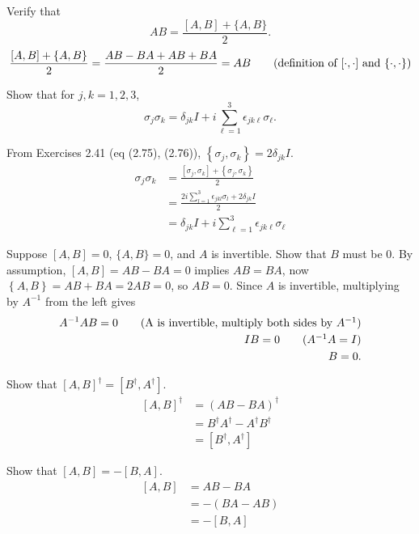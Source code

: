  Verify that $$AB = \frac{[A,B]+\{A,B\}}{2}.$$
\Soln
\begin{align*}
	\frac{\left[A, B \right] + \left\{A, B\right\}}{2} = \frac{AB - BA + AB + BA}{2} = AB \tag{definition of $[\cdot,\cdot]$ and $\{\cdot,\cdot\}$}
\end{align*}

 Show that for $j,k=1,2,3$, $$\sigma_j\sigma_k = \delta_{jk}I+i\sum_{\ell=1}^3\epsilon_{jk\ell}\sigma_\ell.$$

From Exercises 2.41 (eq (2.75), (2.76)), $\left\{\sigma_j,  \sigma_k \right\} = 2 \delta_{jk} I$.
\begin{align*}
	\sigma_j \sigma_k &= \frac{\left[\sigma_j, \sigma_k  \right] + \left\{\sigma_j, \sigma_k \right\}}{2}\tag{Exercise 2.42 (eq 2.77)}\\
		&= \frac{2i \sum_{l=1}^{3} \epsilon_{jkl}\sigma_l +  2 \delta_{jk} I}{2} \tag{Exercise 2.40 (eq 2.74) and above}\\
		&= \delta_{jk} I + i \sum_{\ell=1}^{3} \epsilon_{jk\ell}\sigma_\ell\tag{cancel 2s}
\end{align*}


 Suppose $[A, B] = 0$, $\{A, B\} = 0$, and $A$ is invertible.  Show that $B$ must be 0.
\Soln
By assumption, $\left[A, B\right] = AB-BA=0$ implies $AB=BA$, now $\left\{A, B\right\} = AB+BA=2AB=0$, so $AB = 0$.
Since $A$ is invertible, multiplying by $A^{-1}$ from the left gives
\begin{align*}
	A^{-1} AB = 0 \tag{A is invertible, multiply both sides by $A^{-1}$}\\
	IB = 0 \tag{$A^{-1}A=I$}\\
	B=0.
\end{align*}


 Show that $[A, B]^\dagger = [B^\dagger, A^\dagger]$.
\Soln
\begin{align*}
	\left[A, B\right]^\dagger &= (AB -BA)^\dagger \tag{definition of $[\cdot,\cdot]$}\\
		&= B^\dagger A^\dagger - A^\dagger B^\dagger\tag{properties of $^\dagger$}\\
		&= \left[B^\dagger, A^\dagger \right] \tag{definition of $[\cdot,\cdot]$}
\end{align*}

 Show that $[A,B] = -[B,A]$.
\Soln
\begin{align*}
	\left[A, B\right] &= AB - BA \tag{definition of $[\cdot, \cdot]$}\\
		&= - (BA - AB) \tag{reverse signs}\\
		&= -\left[B, A\right] \tag{definition of $[\cdot, \cdot]$}
\end{align*}

